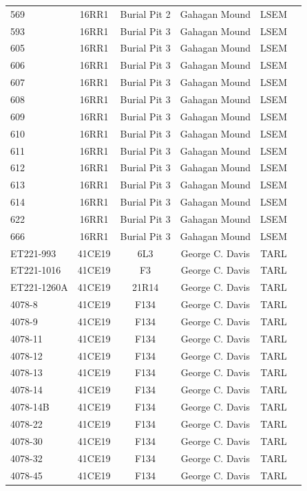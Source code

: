 \documentclass[review]{elsarticle}
\begin{document}
\begin{center}
\begin{longtable}{lccccc}
		569 & 16RR1 & Burial Pit 2 & Gahagan Mound & LSEM\\
		593 & 16RR1 & Burial Pit 3 & Gahagan Mound & LSEM\\
		605 & 16RR1 & Burial Pit 3 & Gahagan Mound & LSEM\\
		606 & 16RR1 & Burial Pit 3 & Gahagan Mound & LSEM\\
		607 & 16RR1 & Burial Pit 3 & Gahagan Mound & LSEM\\
		608 & 16RR1 & Burial Pit 3 & Gahagan Mound & LSEM\\
		609 & 16RR1 & Burial Pit 3 & Gahagan Mound & LSEM\\
		610 & 16RR1 & Burial Pit 3 & Gahagan Mound & LSEM\\
		611 & 16RR1 & Burial Pit 3 & Gahagan Mound & LSEM\\
		612 & 16RR1 & Burial Pit 3 & Gahagan Mound & LSEM\\
		613 & 16RR1 & Burial Pit 3 & Gahagan Mound & LSEM\\
		614 & 16RR1 & Burial Pit 3 & Gahagan Mound & LSEM\\
		622 & 16RR1 & Burial Pit 3 & Gahagan Mound & LSEM\\
		666 & 16RR1 & Burial Pit 3 & Gahagan Mound & LSEM\\
		ET221-993 & 41CE19 & 6L3 & George C. Davis & TARL\\
		ET221-1016 & 41CE19 & F3 & George C. Davis & TARL\\
		ET221-1260A & 41CE19 & 21R14 & George C. Davis & TARL\\
		4078-8 & 41CE19 & F134 & George C. Davis & TARL\\
		4078-9 & 41CE19 & F134 & George C. Davis & TARL\\
		4078-11 & 41CE19 & F134 & George C. Davis & TARL\\
		4078-12 & 41CE19 & F134 & George C. Davis & TARL\\
		4078-13 & 41CE19 & F134 & George C. Davis & TARL\\
		4078-14 & 41CE19 & F134 & George C. Davis & TARL\\
		4078-14B & 41CE19 & F134 & George C. Davis & TARL\\
		4078-22 & 41CE19 & F134 & George C. Davis & TARL\\
		4078-30 & 41CE19 & F134 & George C. Davis & TARL\\
		4078-32 & 41CE19 & F134 & George C. Davis & TARL\\
		4078-45 & 41CE19 & F134 & George C. Davis & TARL\\

\end{longtable}
\end{center}
\end{document}

